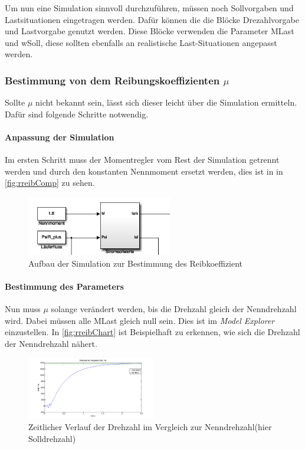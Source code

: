 Um nun eine Simulation sinnvoll durchzuführen, müssen noch Sollvorgaben und Lastsituationen eingetragen werden. Dafür können die die Blöcke Drezahlvorgabe und Lastvorgabe genutzt werden. Diese Blöcke verwenden die Parameter MLast und wSoll, diese sollten ebenfalls an realistische Last-Situationen angepasst werden.\\\par

\subsubsection{Bestimmung von dem Reibungskoeffizienten $\mu$}
Sollte $\mu$  nicht bekannt sein, lässt sich dieser leicht über die Simulation ermitteln. Dafür sind folgende Schritte notwendig.
\paragraph{Anpassung der Simulation}
	Im ersten Schritt muss der Momentregler vom Rest der Simulation getrennt werden und durch den konstanten Nennmoment ersetzt werden, dies ist in in \autoref{fig:rreibComp} zu sehen.
	\begin{figure}[H]
		\includegraphics[width=2.5in]{pictures/Reibkoeffizient_bestimmen}
		\caption{Aufbau der Simulation zur Bestimmung des Reibkoeffizient}
		\label{fig:rreibComp}
	\end{figure}
\paragraph{Bestimmung des Parameters}\label{par:mu0BestimmungParameter}
	Nun muss \begin{math}\mu\end{math} solange verändert werden, bis die Drehzahl gleich der Nenndrehzahl wird. Dabei müssen alle MLast gleich null sein. Dies ist im \textit{Model Explorer} einzustellen. In \autoref{fig:rreibChart} ist Beispielhaft zu erkennen, wie sich die Drehzahl der Nenndrehzahl nähert. 
	\begin{figure}[H]
		\includegraphics[width=0.5\textwidth]{pictures/Reibkoeffizient_Chart.png}
		\caption{Zeitlicher Verlauf der Drehzahl im Vergleich zur Nenndrehzahl(hier Solldrehzahl)}
		\label{fig:rreibChart}
	\end{figure}	
	
